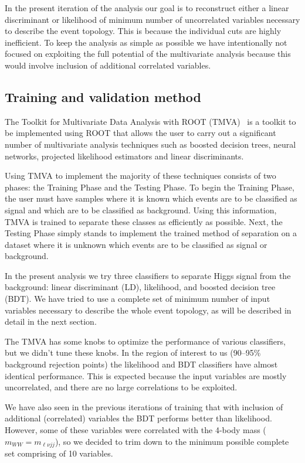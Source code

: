 
In the present iteration of the analysis our goal is to 
reconstruct either a linear discriminant or likelihood of 
minimum number of uncorrelated variables necessary to 
describe the event topology. 
This is because the individual cuts are highly 
inefficient. 
To keep the analysis as simple as possible we have intentionally 
not focused on exploiting the full potential of the 
multivariate analysis because this would involve 
inclusion of additional correlated variables.



\subsection{Training and validation method}
The Toolkit for Multivariate Data Analysis with ROOT 
(TMVA)~\cite{tmva}
is a toolkit to be implemented using ROOT that allows the user 
to carry out a significant number of multivariate analysis 
techniques such as boosted decision trees, neural networks, 
projected likelihood estimators and linear discriminants.

Using TMVA to implement the majority of these techniques 
consists of two phases: the Training Phase and the Testing Phase. 
To begin the Training Phase, the user must have samples where 
it is known which events are to be classified as signal and which 
are to be classified as background. 
Using this information, TMVA is trained to separate these classes 
as efficiently as possible. 
Next, the Testing Phase simply stands to implement the trained 
method of separation on a dataset where it is unknown which 
events are to be classified as signal or background. 

In the present analysis we try three classifiers to separate 
Higgs signal from the background: linear discriminant (LD),
likelihood, and boosted decision tree (BDT).
We have tried to use a complete set of minimum number of 
input variables necessary to describe the whole event topology, 
as will be described in detail in the next section.


The TMVA has some knobs to optimize the
performance of various classifiers, but we didn't tune these knobs. 
In the region of interest to us (90--95\% background
rejection points) the likelihood and BDT classifiers have almost 
identical performance. 
This is expected because the input variables are mostly uncorrelated, 
and there are no large correlations to be exploited.

We have also seen in the previous iterations of training that
with inclusion of additional (correlated) variables the BDT
performs better than likelihood. However, some of these
variables were correlated with the 4-body mass ($m_{WW} = m_{\ell\nu jj}$), 
so we decided to trim down to the minimum possible complete
set comprising of 10 variables. 


